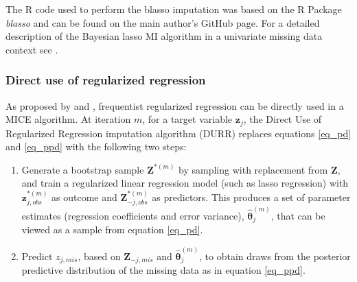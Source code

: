 	The R code used to perform the blasso imputation was based on the R Package \emph{blasso} \citep{blasso} and can 
	be found on the main author's GitHub page.
	For a detailed description of the Bayesian lasso MI algorithm in a univariate missing data context see \cite{zhaoLong:2016}.

\subsubsection{Direct use of regularized regression}
	As proposed by \cite{zhaoLong:2016} and \cite{dengEtAl:2016}, frequentist regularized regression can be 
	directly used in a MICE algorithm.
	At iteration $m$, for a target variable $\bm{z}_j$, the Direct Use of Regularized Regression imputation algorithm (DURR) replaces equations \eqref{eq_pd} and \eqref{eq_ppd} with the following two steps:

	\begin{enumerate}

	\item Generate a bootstrap sample $\bm{Z}^{*(m)}$ by sampling with replacement from $\bm{Z}$,
		and train a regularized linear regression model (such as lasso regression) with
		$\bm{z}_{j,obs}^{*(m)}$ as outcome and $\bm{Z}_{-j,obs}^{*(m)}$ as predictors.
		This produces a set of parameter estimates (regression coefficients and error variance),
		$\hat{\bm{\theta}}_{j}^{(m)}$, that can be viewed as a sample from equation \eqref{eq_pd}.

	\item Predict $z_{j,mis}$, based on $\bm{Z}_{-j, mis}$ and $\hat{\bm{\theta}}_{j}^{(m)}$, 
		to obtain draws from the posterior predictive distribution of the missing data as in equation 
		\eqref{eq_ppd}.

	\end{enumerate}

